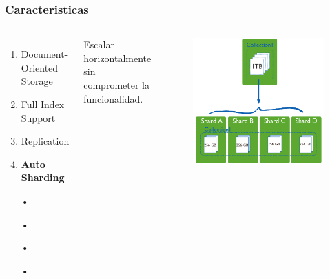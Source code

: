\documentclass{beamer}
\begin{document}
\begin{frame}
\frametitle{Caracteristicas}
\begin{columns}[c] %

\begin{enumerate}
\item Document-Oriented Storage
\item Full Index Support
\item Replication
\item \textbf{Auto Sharding}
\item[•]	
\item[•]	
\item[•]	
\item[•]	
\end{enumerate}

Escalar horizontalmente sin comprometer la funcionalidad.
\begin{figure}
\includegraphics[width=0.8\linewidth]{sharded-collection.png}
\end{figure}
\end{columns}
\end{frame}
\end{document}
